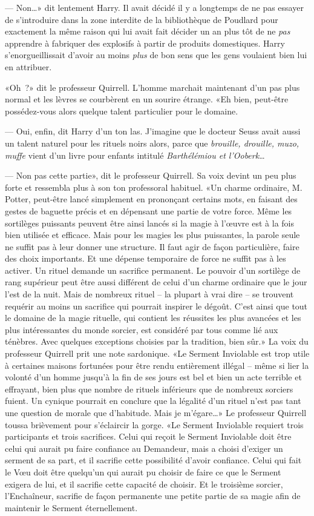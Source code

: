 --- Non…» dit lentement Harry. Il avait décidé il y a longtemps de ne pas essayer de s'introduire dans la zone interdite de la bibliothèque de Poudlard pour exactement la même raison qui lui avait fait décider un an plus tôt de ne \emph{pas} apprendre à fabriquer des explosifs à partir de produits domestiques. Harry s'enorgueillissait d'avoir au moins \emph{plus} de bon sens que les gens voulaient bien lui en attribuer.

«Oh~?» dit le professeur Quirrell. L'homme marchait maintenant d'un pas plus normal et les lèvres se courbèrent en un sourire étrange. «Eh bien, peut-être possédez-vous alors quelque talent particulier pour le domaine.

--- Oui, enfin, dit Harry d'un ton las. J'imagine que le docteur Seuss avait aussi un talent naturel pour les rituels noirs alors, parce que \emph{brouille, drouille, muzo, muffe} vient d'un livre pour enfants intitulé \emph{Barthélémiou et l'Ooberk}…

--- Non pas cette partie», dit le professeur Quirrell. Sa voix devint un peu plus forte et ressembla plus à son ton professoral habituel. «Un charme ordinaire, M. Potter, peut-être lancé simplement en prononçant certains mots, en faisant des gestes de baguette précis et en dépensant une partie de votre force. Même les sortilèges puissants peuvent être ainsi lancés si la magie à l'œuvre est à la fois bien utilisée et efficace. Mais pour les magies les plus puissantes, la parole seule ne suffit pas à leur donner une structure. Il faut agir de façon particulière, faire des choix importants. Et une dépense temporaire de force ne suffit pas à les activer. Un rituel demande un sacrifice permanent. Le pouvoir d'un sortilège de rang supérieur peut être aussi différent de celui d'un charme ordinaire que le jour l'est de la nuit. Mais de nombreux rituel -- la plupart à vrai dire -- se trouvent requérir au moins un sacrifice qui pourrait inspirer le dégoût. C'est ainsi que tout le domaine de la magie rituelle, qui contient les réussites les plus avancées et les plus intéressantes du monde sorcier, est considéré par tous comme lié aux ténèbres. Avec quelques exceptions choisies par la tradition, bien sûr.» La voix du professeur Quirrell prit une note sardonique. «Le Serment Inviolable est trop utile à certaines maisons fortunées pour être rendu entièrement illégal -- même si lier la volonté d'un homme jusqu'à la fin de ses jours est bel et bien un acte terrible et effrayant, bien plus que nombre de rituels inférieurs que de nombreux sorciers fuient. Un cynique pourrait en conclure que la légalité d'un rituel n'est pas tant une question de morale que d'habitude. Mais je m'égare…» Le professeur Quirrell toussa brièvement pour s'éclaircir la gorge. «Le Serment Inviolable requiert trois participants et trois sacrifices. Celui qui reçoit le Serment Inviolable doit être celui qui aurait pu faire confiance au Demandeur, mais a choisi d'exiger un serment de sa part, et il sacrifie cette possibilité d'avoir confiance. Celui qui fait le Vœu doit être quelqu'un qui aurait pu choisir de faire ce que le Serment exigera de lui, et il sacrifie cette capacité de choisir. Et le troisième sorcier, l'Enchaîneur, sacrifie de façon permanente une petite partie de sa magie afin de maintenir le Serment éternellement.

